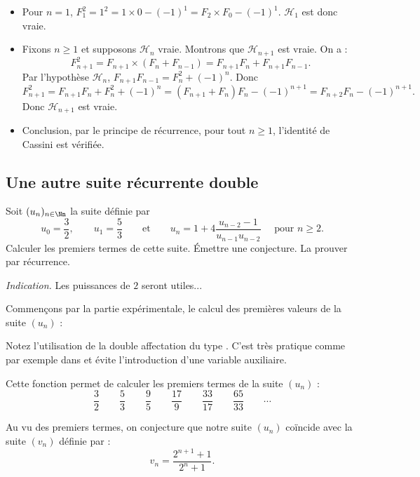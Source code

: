 \documentclass[class=report,crop=false]{standalone}
\begin{document}
\begin{itemize}
  \item Pour $n=1$, $F_1^2 = 1^2 = 1\times 0 - (-1)^1 = F_2\times F_0 - (-1)^1$.
  $\mathcal{H}_1$ est donc vraie.
  \item Fixons $n \ge 1$ et supposons $\mathcal{H}_n$ vraie.
  Montrons que $\mathcal{H}_{n+1}$ est vraie. On a : 
  $$F_{n+1}^2 = F_{n+1}\times (F_n+F_{n-1})
  = F_{n+1}F_n+F_{n+1}F_{n-1}.$$
  Par l'hypothèse $\mathcal{H}_n$, $F_{n+1}F_{n-1}=F_n^2+(-1)^n$.
  Donc
  $$F_{n+1}^2 =F_{n+1}F_n+ F_n^2+(-1)^n = (F_{n+1}+F_n)F_n - (-1)^{n+1} 
  = F_{n+2}F_n - (-1)^{n+1}.$$
  Donc $\mathcal{H}_{n+1}$ est vraie.
  \item Conclusion, par le principe de récurrence, pour tout $n\ge1$, 
  l'identité de Cassini est vérifiée.
\end{itemize}




\subsection{Une autre suite récurrente double}

\begin{tp}
Soit $(u_n)_{n \in \Nn}$ la suite définie par 
$$u_0 = \frac32, \qquad u_1 = \frac53 \qquad \mbox{et} \qquad u_n = 1 + 4\frac{u_{n-2}-1}{u_{n-1}u_{n-2}}
\quad \text{ pour } n\ge 2.$$
Calculer les premiers termes de cette suite. \'Emettre une conjecture. 
La prouver par récurrence.

\emph{Indication.} Les puissances de $2$ seront utiles...
\end{tp}

Commençons par la partie expérimentale, le calcul des premières valeurs de la suite $(u_n)$ :

Notez l'utilisation de la double affectation du type .
C'est très pratique comme par exemple dans 
et évite l'introduction d'une variable auxiliaire.

Cette fonction  permet de calculer les premiers termes de la suite $(u_n)$ :
$$\frac32 \qquad \frac 53 \qquad \frac95 \qquad \frac{17}{9} \qquad \frac{33}{17} \qquad \frac{65}{33} \qquad \cdots$$


Au vu des premiers termes, on conjecture que notre suite $(u_n)$ coïncide 
avec la suite $(v_n)$ définie par :
$$v_n = \frac{2^{n+1} + 1}{2^n + 1}.$$
\end{document}
